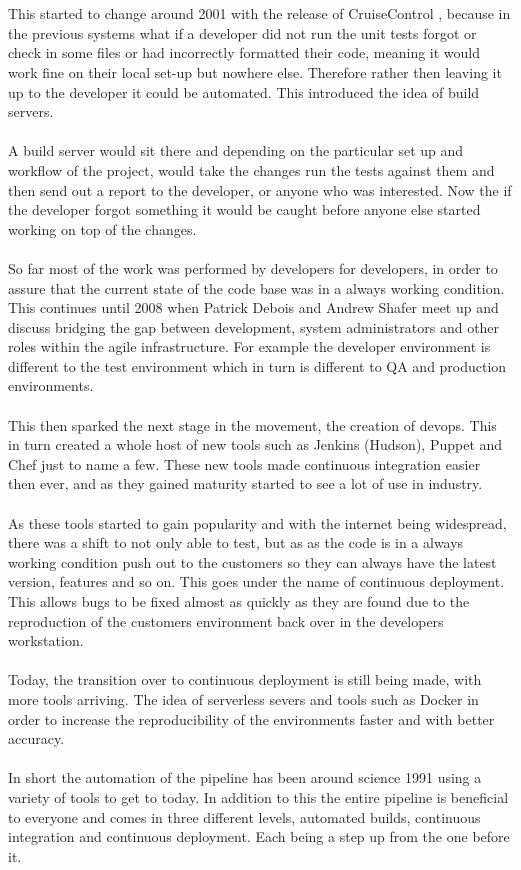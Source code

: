 \\\\
This started to change around 2001 with the release of CruiseControl \citep{cc}, because in the previous systems what if a developer did not run the unit tests forgot or check in some files or had incorrectly formatted their code, meaning it would work fine on their local set-up but nowhere else. Therefore rather then leaving it up to the developer it could be automated. This introduced the idea of build servers. 
\\\\
A build server would sit there and depending on the particular set up and workflow of the project,  would take the changes run the tests against them and then send out a report to the developer, or anyone who was interested. Now the if the developer forgot something it would be caught before anyone else started working on top of the changes.
\\\\
So far most of the work was performed by developers for developers, in order to assure that the current state of the code base was in a always working condition. This continues until 2008 when Patrick Debois and Andrew Shafer meet up and discuss bridging the gap between development, system administrators and other roles within the agile infrastructure. For example the developer environment is different to the test environment which in turn is different to QA and production environments. 
\\\\
This then sparked the next stage in the movement, the creation of devops. This in turn created a whole host of new tools such as Jenkins (Hudson), Puppet and Chef just to name a few. These new tools made continuous integration easier then ever, and as they gained maturity started to see a lot of use in industry. \citep{devop_history}
\\\\
As these tools started to gain popularity and with the internet being widespread, there was a shift to not only able to test, but as as the code is in a always working condition push out to the customers so they can always have the latest version, features and so on. This goes under the name of continuous deployment. This allows bugs to be fixed almost as quickly as they are found due to the reproduction of the customers environment back over in the developers workstation.
\\\\
Today, the transition over to continuous deployment is still being made, with more tools arriving. The idea of serverless severs and tools such as Docker in order to increase the reproducibility of the environments faster and with better accuracy.
\\\\
In short the automation of the pipeline has been around science 1991 using a variety of tools to get to today. In addition to this the entire pipeline is beneficial to everyone and comes in three different levels, automated builds, continuous integration and continuous deployment. Each being a step up from the one before it. 


